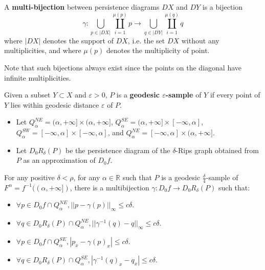 \documentclass{beamer}
\theoremstyle{definition}
\newcommand{\R}{\mathbb{R}}
\begin{document}
\begin{frame}
\begin{definition}
A \textbf{multi-bijection} between persistence diagrams $DX$ and $DY$ is a bijection
\[
\gamma:\bigcup_{p\in|DX|}\coprod_{i=1}^{\mu(p)}p\to \bigcup_{q\in|DY|}\coprod_{i=1}^{\mu(q)}q
\]
where $|DX|$ denotes the support of $DX$, i.e. the set $DX$ without any multiplicities, and where $\mu(p)$ denotes the multiplicity of point. 
\end{definition}\pause 
Note that such bijections always exist since the points on the diagonal have
infinite multiplicities. %
\end{frame}

\begin{frame}
\begin{definition}
Given a subset $Y \subset X$ and $\varepsilon > 0$, $P$ is a \textbf{geodesic $\varepsilon$-sample} of $Y$ if every point of $Y$ lies within geodesic distance $\varepsilon$ of $P$.
\end{definition}
\begin{itemize}
\item<2-> Let $Q_\alpha^{NE}= (\alpha,+\infty]\times (\alpha,+\infty]$, $Q_\alpha^{SE}=(\alpha,+\infty]\times[-\infty,\alpha]$, $Q_\alpha^{SW}=[-\infty,\alpha]\times[-\infty,\alpha]$, and $Q_\alpha^{NE}=[-\infty,\alpha]\times(\alpha,+\infty]$. %

\item<3-> Let $D_0R_\delta(P)$ be the persistence diagram of the $\delta$-Rips graph obtained from $P$ as an approximation of $D_0f$.
\end{itemize}
\end{frame}

\begin{frame}
\begin{theorem}
For any positive $\delta < \rho$, for
any $\alpha\in \R$ such that $P$ is a geodesic $\frac{\delta}{4}$-sample of $F^\alpha=f^{-1}((\alpha,+\infty])$, there is a multibijection $\gamma: D_0f \to D_0R_\delta(P)$ such that:
\begin{itemize}
\item $\forall p\in D_0f\cap Q_\alpha^{NE}, ||p-\gamma(p)||_{\infty}\leq c\delta$.
\item $\forall q\in D_0R_\delta(P)\cap Q_\alpha^{NE}, ||\gamma^{-1}(q)-q||_{\infty}\leq c\delta$.
\item $\forall p\in D_0f\cap Q_\alpha^{SE}, |p_x-\gamma(p)_x|\leq c\delta$.
\item $\forall q\in D_0R_\delta(P)\cap Q_\alpha^{SE}, |\gamma^{-1}(q)_x-q_x|\leq c\delta$.
\end{itemize}
\end{theorem}
\end{frame}
\end{document}
